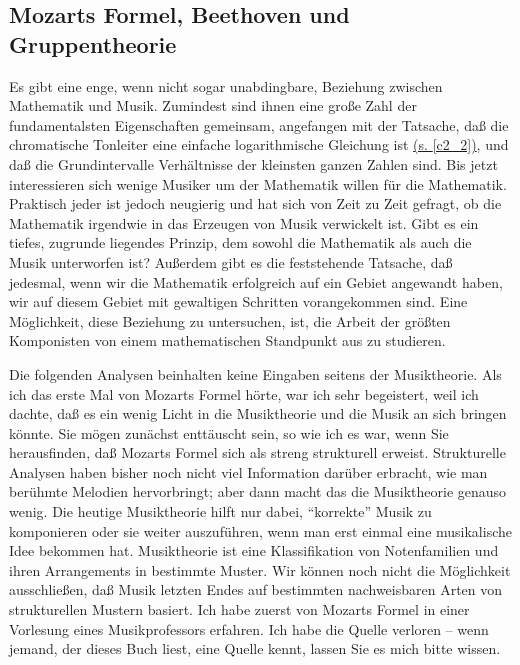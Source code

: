 
\subsection{Mozarts Formel, Beethoven und Gruppentheorie}
\label{c1iv4}

Es gibt eine enge, wenn nicht sogar unabdingbare, Beziehung zwischen Mathematik und Musik.
Zumindest sind ihnen eine große Zahl der fundamentalsten Eigenschaften gemeinsam, angefangen mit der Tatsache, daß die chromatische Tonleiter eine einfache logarithmische Gleichung ist \hyperref[c2_2]{(s. \autoref{c2_2})}, und daß die Grundintervalle Verhältnisse der kleinsten ganzen Zahlen sind.
Bis jetzt interessieren sich wenige Musiker um der Mathematik willen für die Mathematik.
Praktisch jeder ist jedoch neugierig und hat sich von Zeit zu Zeit gefragt, ob die Mathematik irgendwie in das Erzeugen von Musik verwickelt ist.
Gibt es ein tiefes, zugrunde liegendes Prinzip, dem sowohl die Mathematik als auch die Musik unterworfen ist?
Außerdem gibt es die feststehende Tatsache, daß jedesmal, wenn wir die Mathematik erfolgreich auf ein Gebiet angewandt haben, wir auf diesem Gebiet mit gewaltigen Schritten vorangekommen sind.
Eine Möglichkeit, diese Beziehung zu untersuchen, ist, die Arbeit der größten Komponisten von einem mathematischen Standpunkt aus zu studieren.

Die folgenden Analysen beinhalten keine Eingaben seitens der Musiktheorie.
Als ich das erste Mal von Mozarts Formel hörte, war ich sehr begeistert, weil ich dachte, daß es ein wenig Licht in die Musiktheorie und die Musik an sich bringen könnte.
Sie mögen zunächst enttäuscht sein, so wie ich es war, wenn Sie herausfinden, daß Mozarts Formel sich als streng strukturell erweist.
Strukturelle Analysen haben bisher noch nicht viel Information darüber erbracht, wie man berühmte Melodien hervorbringt; aber dann macht das die Musiktheorie genauso wenig.
Die heutige Musiktheorie hilft nur dabei, \enquote{korrekte} Musik zu komponieren oder sie weiter auszuführen, wenn man erst einmal eine musikalische Idee bekommen hat.
Musiktheorie ist eine Klassifikation von Notenfamilien und ihren Arrangements in bestimmte Muster.
Wir können noch nicht die Möglichkeit ausschließen, daß Musik letzten Endes auf bestimmten nachweisbaren Arten von strukturellen Mustern basiert.
Ich habe zuerst von Mozarts Formel in einer Vorlesung eines Musikprofessors erfahren.
Ich habe die Quelle verloren -- wenn jemand, der dieses Buch liest, eine Quelle kennt, lassen Sie es mich bitte wissen.

